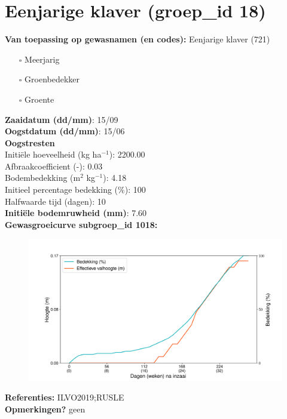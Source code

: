 \documentclass{article}
\begin{document}
 \section{Eenjarige klaver (groep\_id 18)} 
 \textbf{Van toepassing op gewasnamen (en codes):} Eenjarige klaver (721) 
 \begin{multicols}{3} \begin{itemize} \item[$\square$] Meerjarig \item[$\square$] Groenbedekker \item[$\square$] Groente \end{itemize} \end{multicols} 
  \textbf{Zaaidatum (dd/mm)}: 15/09  \vspace{0.10cm} \\ 
  \textbf{Oogstdatum (dd/mm)}: 15/06  \vspace{0.10cm} \\ 
  \textbf{Oogstresten} \vspace{0.05cm} \\ 
  \tab Initi\"{e}le hoeveelheid (kg ha$^{-1}$): 2200.00 \vspace{0.05cm} \\ 
  \tab Afbraakcoefficient (-): 0.03 \vspace{0.05cm} \\ 
  \tab Bodembedekking (m$^2$ kg$^{-1}$): 4.18 \vspace{0.05cm} \\ 
  \tab Initieel percentage bedekking (\%): 100 \vspace{0.05cm} \\ 
  \tab Halfwaarde tijd (dagen): 10 \vspace{0.05cm} \\ 
  \textbf{Initi\"{e}le bodemruwheid (mm)}: 7.60 \vspace{0.05cm} \\ 
  \textbf{Gewasgroeicurve subgroep\_id 1018:} 
 \begin{center} \begin{figure}[H] \includegraphics[width=12.5cm]{temp/1018.png} \end{figure} \end{center} 
  \textbf{Referenties:} ILVO2019;RUSLE \vspace{0.10cm} \\ 
  \textbf{Opmerkingen?} geen \vspace{0.10cm} \\ 
 \newpage 
\end{document}
